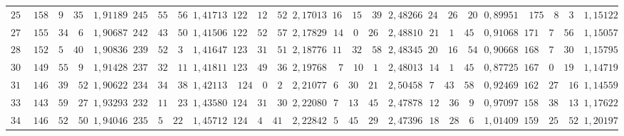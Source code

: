 \begin{landscape}
\begin{center}
\begin{tabular}{r|r|r|r|r|r|r|r|r|r|r|r|r}
\(255\) & \(158\quad 9\quad 35\) & \(1{,}91189\) & \(245\quad 55\quad 56\) & \(1{,}41713\) & \(122\quad 12\quad 52\) & \(2{,}17013\) & \(16\quad 15\quad 39\) & \(2{,}48266\) & \(24\quad 26\quad 20\) & \(0{,}89951\) & \(175\quad 8\quad 3\) & \(1{,}15122\) \\
\(270\) & \(155\quad 34\quad 6\) & \(1{,}90687\) & \(242\quad 43\quad 50\) & \(1{,}41506\) & \(122\quad 52\quad 57\) & \(2{,}17829\) & \(14\quad 0\quad 26\) & \(2{,}48810\) & \(21\quad 1\quad 45\) & \(0{,}91068\) & \(171\quad 7\quad 56\) & \(1{,}15057\) \\
\(285\) & \(152\quad 5\quad 40\) & \(1{,}90836\) & \(239\quad 52\quad 3\) & \(1{,}41647\) & \(123\quad 31\quad 51\) & \(2{,}18776\) & \(11\quad 32\quad 58\) & \(2{,}48345\) & \(20\quad 16\quad 54\) & \(0{,}90668\) & \(168\quad 7\quad 30\) & \(1{,}15795\) \\[3pt]
\(300\) & \(149\quad 55\quad 9\) & \(1{,}91428\) & \(237\quad 32\quad 11\) & \(1{,}41811\) & \(123\quad 49\quad 36\) & \(2{,}19768\) & \(7\quad 10\quad 1\) & \(2{,}48013\) & \(14\quad 1\quad 45\) & \(0{,}87725\) & \(167\quad 0\quad 19\) & \(1{,}14719\) \\
\(315\) & \(146\quad 39\quad 52\) & \(1{,}90622\) & \(234\quad 34\quad 38\) & \(1{,}42113\) & \(124\quad 0\quad 2\) & \(2{,}21077\) & \(6\quad 30\quad 21\) & \(2{,}50458\) & \(7\quad 43\quad 58\) & \(0{,}92469\) & \(162\quad 27\quad 16\) & \(1{,}14559\) \\
\(330\) & \(143\quad 59\quad 27\) & \(1{,}93293\) & \(232\quad 11\quad 23\) & \(1{,}43580\) & \(124\quad 31\quad 30\) & \(2{,}22080\) & \(7\quad 13\quad 45\) & \(2{,}47878\) & \(12\quad 36\quad 9\) & \(0{,}97097\) & \(158\quad 38\quad 13\) & \(1{,}17622\) \\
\(345\) & \(146\quad 52\quad 50\) & \(1{,}94046\) & \(235\quad 5\quad 22\) & \(1{,}45712\) & \(124\quad 4\quad 41\) & \(2{,}22842\) & \(5\quad 45\quad 29\) & \(2{,}47396\) & \(18\quad 28\quad 6\) & \(1{,}01409\) & \(159\quad 25\quad 52\) & \(1{,}20197\) \\
\end{tabular}
\end{center}
\endgroup
\end{landscape}

